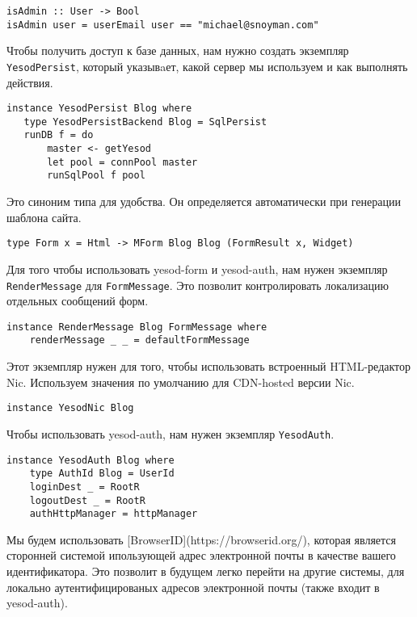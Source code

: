 \begin{lstlisting}
isAdmin :: User -> Bool
isAdmin user = userEmail user == "michael@snoyman.com"
\end{lstlisting}
 
Чтобы получить доступ к базе данных, нам нужно создать экземпляр \lstinline!YesodPersist!, который указывaет, какой сервер мы используем и как выполнять действия. 
 
\begin{lstlisting}
instance YesodPersist Blog where
   type YesodPersistBackend Blog = SqlPersist
   runDB f = do 
       master <- getYesod
       let pool = connPool master
       runSqlPool f pool
\end{lstlisting}
 
Это синоним типа для удобства. Он определяется автоматически при генерации шаблона сайта. 
 
\begin{lstlisting}
type Form x = Html -> MForm Blog Blog (FormResult x, Widget)
\end{lstlisting}
 
Для того чтобы использовать yesod-form и yesod-auth, нам нужен экземпляр \lstinline!RenderMessage! для \lstinline!FormMessage!. Это позволит контролировать локализацию отдельных сообщений форм. 
 
\begin{lstlisting}
instance RenderMessage Blog FormMessage where
    renderMessage _ _ = defaultFormMessage
\end{lstlisting}
 
Этот экземпляр нужен для того, чтобы использовать встроенный HTML-редактор Nic. Используем значения по умолчанию для CDN-hosted версии Nic.
 
\begin{lstlisting}
instance YesodNic Blog
\end{lstlisting}
 
Чтобы использовать yesod-auth, нам нужен экземпляр \lstinline!YesodAuth!. 
 
\begin{lstlisting}
instance YesodAuth Blog where
    type AuthId Blog = UserId
    loginDest _ = RootR
    logoutDest _ = RootR
    authHttpManager = httpManager
\end{lstlisting}
 
Мы будем использовать [BrowserID](https://browserid.org/), которая является сторонней системой ипользующей адрес электронной почты в качестве вашего идентификатора. Это позволит в будущем легко перейти на другие системы, для локально аутентифицированых адресов электронной почты (также входит в yesod-auth). 
 
